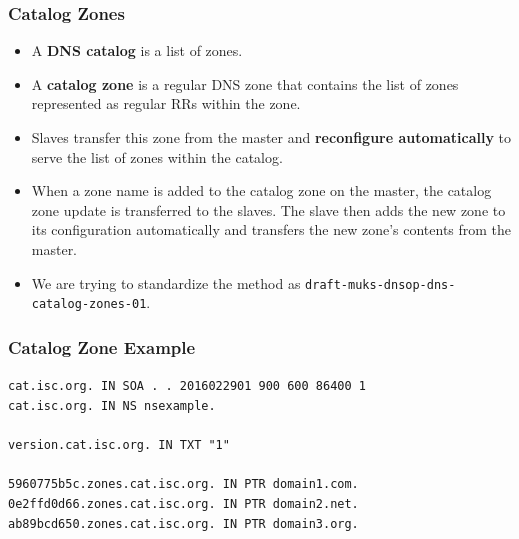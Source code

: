 \documentclass[aspectratio=169,14pt]{beamer}
\begin{document}
\frame
{
  \frametitle{Catalog Zones}

  \begin{itemize}

  \item A \textbf{DNS catalog} is a list of zones.

  \item A \textbf{catalog zone} is a regular DNS zone that contains the
    list of zones represented as regular RRs within the zone.

  \item Slaves transfer this zone from the master and
    \textbf{reconfigure automatically} to serve the list of zones within
    the catalog.

  \item When a zone name is added to the catalog zone on the master, the
    catalog zone update is transferred to the slaves. The slave then
    adds the new zone to its configuration automatically and transfers
    the new zone's contents from the master.

  \item We are trying to standardize the method as
    \texttt{draft-muks-dnsop-dns-catalog-zones-01}.

  \end{itemize}
}

\frame
{
  \frametitle{Catalog Zone Example}

\texttt{cat.isc.org. IN SOA . . 2016022901 900 600 86400 1}\\
\texttt{cat.isc.org. IN NS nsexample.}\\
~\\
\texttt{version.cat.isc.org. IN TXT "1"}\\
~\\
\texttt{5960775b5c.zones.cat.isc.org. IN PTR domain1.com.}\\
\texttt{0e2ffd0d66.zones.cat.isc.org. IN PTR domain2.net.}\\
\texttt{ab89bcd650.zones.cat.isc.org. IN PTR domain3.org.}

}
\end{document}
